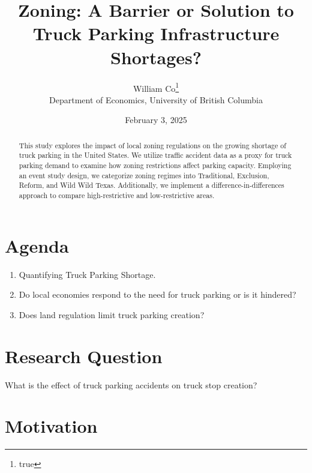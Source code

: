 \documentclass[
  12pt]{article}
\begin{document}
\def\spacingset#1{\renewcommand{\baselinestretch}%
{#1}\small\normalsize} \spacingset{1}



\date{February 3, 2025}
\title{\bf Zoning: A Barrier or Solution to Truck Parking Infrastructure
Shortages?}
\author{
William Co\thanks{true}\\
Department of Economics, University of British Columbia\\
}
\maketitle

\bigskip
\bigskip
\begin{abstract}
This study explores the impact of local zoning regulations on the
growing shortage of truck parking in the United States. We utilize
traffic accident data as a proxy for truck parking demand to examine how
zoning restrictions affect parking capacity. Employing an event study
design, we categorize zoning regimes into Traditional, Exclusion,
Reform, and Wild Wild Texas. Additionally, we implement a
difference-in-differences approach to compare high-restrictive and
low-restrictive areas.
\end{abstract}


\newpage
\spacingset{1.9} %

\section{Agenda}\label{agenda}

\begin{enumerate}
\def\labelenumi{\arabic{enumi}.}
\item
  Quantifying Truck Parking Shortage.~
\item
  Do local economies respond to the need for truck parking or is it
  hindered?
\item
  Does land regulation limit truck parking creation?
\end{enumerate}

\section{Research Question}\label{research-question}

What is the effect of truck parking accidents on truck stop creation?

\section{Motivation}\label{motivation}
\end{document}
